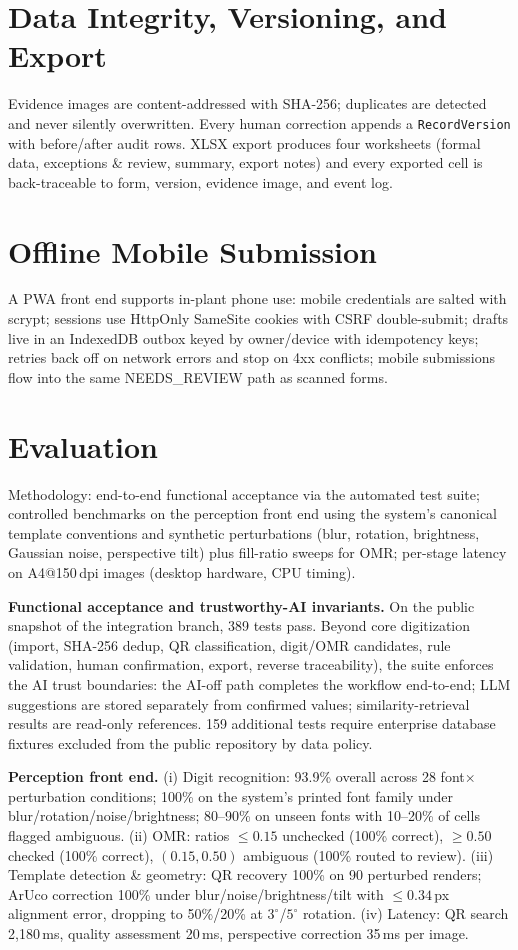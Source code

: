 \documentclass[conference]{IEEEtran}
\begin{document}
\section{Data Integrity, Versioning, and Export}
Evidence images are content-addressed with SHA-256; duplicates are detected and never silently overwritten. Every human correction appends a \texttt{RecordVersion} with before/after audit rows. XLSX export produces four worksheets (formal data, exceptions \& review, summary, export notes) and every exported cell is back-traceable to form, version, evidence image, and event log.

\section{Offline Mobile Submission}
A PWA front end supports in-plant phone use: mobile credentials are salted with scrypt; sessions use HttpOnly SameSite cookies with CSRF double-submit; drafts live in an IndexedDB outbox keyed by owner/device with idempotency keys; retries back off on network errors and stop on 4xx conflicts; mobile submissions flow into the same NEEDS\_REVIEW path as scanned forms.

\section{Evaluation}
Methodology: end-to-end functional acceptance via the automated test suite; controlled benchmarks on the perception front end using the system's canonical template conventions and synthetic perturbations (blur, rotation, brightness, Gaussian noise, perspective tilt) plus fill-ratio sweeps for OMR; per-stage latency on A4@150\,dpi images (desktop hardware, CPU timing).

\textbf{Functional acceptance and trustworthy-AI invariants.} On the public snapshot of the integration branch, 389 tests pass. Beyond core digitization (import, SHA-256 dedup, QR classification, digit/OMR candidates, rule validation, human confirmation, export, reverse traceability), the suite enforces the AI trust boundaries: the AI-off path completes the workflow end-to-end; LLM suggestions are stored separately from confirmed values; similarity-retrieval results are read-only references. 159 additional tests require enterprise database fixtures excluded from the public repository by data policy.

\textbf{Perception front end.} (i) Digit recognition: 93.9\% overall across 28 font$\times$perturbation conditions; 100\% on the system's printed font family under blur/rotation/noise/brightness; 80--90\% on unseen fonts with 10--20\% of cells flagged ambiguous. (ii) OMR: ratios $\leq 0.15$ unchecked (100\% correct), $\geq 0.50$ checked (100\% correct), $(0.15,0.50)$ ambiguous (100\% routed to review). (iii) Template detection \& geometry: QR recovery 100\% on 90 perturbed renders; ArUco correction 100\% under blur/noise/brightness/tilt with $\leq 0.34$\,px alignment error, dropping to 50\%/20\% at $3^\circ$/$5^\circ$ rotation. (iv) Latency: QR search 2{,}180\,ms, quality assessment 20\,ms, perspective correction 35\,ms per image.
\end{document}
